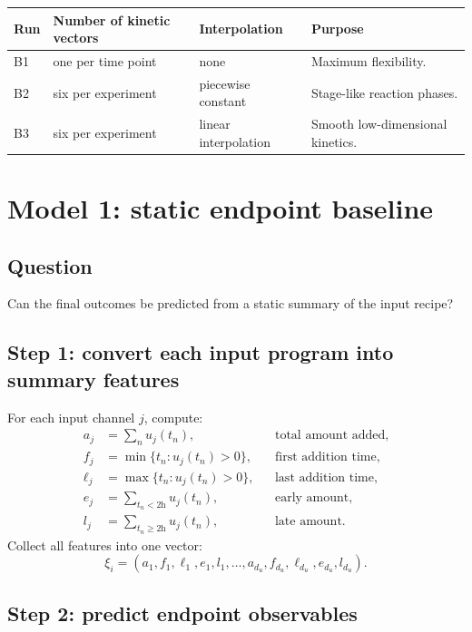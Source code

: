 \documentclass[11pt]{article}
\begin{document}
\begin{center}
\begin{tabularx}{\textwidth}{lllX}
\toprule
Run & Number of kinetic vectors & Interpolation & Purpose \\
\midrule
B1 & one per time point & none & Maximum flexibility. \\
B2 & six per experiment & piecewise constant & Stage-like reaction phases. \\
B3 & six per experiment & linear interpolation & Smooth low-dimensional kinetics. \\
\bottomrule
\end{tabularx}
\end{center}

\section{Model 1: static endpoint baseline}

\subsection{Question}
Can the final outcomes be predicted from a static summary of the input recipe?

\subsection{Step 1: convert each input program into summary features}

For each input channel $j$, compute:
\begin{align}
    a_j &= \sum_n u_j(t_n), &&\text{total amount added}, \\
    f_j &= \min\{t_n: u_j(t_n)>0\}, &&\text{first addition time}, \\
    \ell_j &= \max\{t_n: u_j(t_n)>0\}, &&\text{last addition time}, \\
    e_j &= \sum_{t_n<2\mathrm{h}}u_j(t_n), &&\text{early amount}, \\
    l_j &= \sum_{t_n\geq 2\mathrm{h}}u_j(t_n), &&\text{late amount}.
\end{align}
Collect all features into one vector:
\begin{equation}
    \xi_i = \left(a_1,f_1,\ell_1,e_1,l_1,\ldots,a_{d_u},f_{d_u},\ell_{d_u},e_{d_u},l_{d_u}\right).
\end{equation}

\subsection{Step 2: predict endpoint observables}
\end{document}
